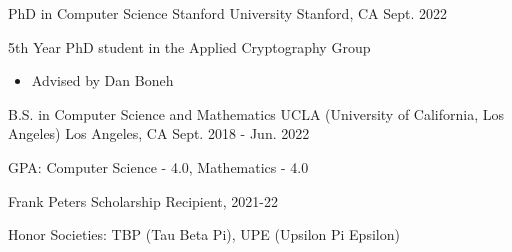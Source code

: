 

\begin{cventries}

\cventry
    {PhD in Computer Science} %
    {Stanford University} %
    {Stanford, CA} %
    {Sept. 2022} %
    {
      \begin{cvitems} %
        \item {5th Year PhD student in the Applied Cryptography Group}
        \begin{itemize}
          \item{Advised by Dan Boneh}
        \end{itemize}
      \end{cvitems}
    }

  \cventry
    {B.S. in Computer Science and Mathematics} %
    {UCLA (University of California, Los Angeles)} %
    {Los Angeles, CA} %
    {Sept. 2018 - Jun. 2022} %
    {
      \begin{cvitems} %
        \item {GPA: Computer Science - 4.0, Mathematics - 4.0}
        \item {Frank Peters Scholarship Recipient, 2021-22}
        \item{Honor Societies: TBP (Tau Beta Pi), UPE (Upsilon Pi Epsilon)}
      \end{cvitems}
    }

\end{cventries}
